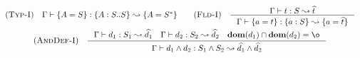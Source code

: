 \[\begin{array}{c}
    \RULE{Typ-I} \quad
        \TJ{\Gamma}{\DEF{A}{S}}{\TDEC{A}{S}{S}}{\DEF{A}{\TRANS{S}}}
    \qquad

    \RULE{Fld-I} \quad \inference{
        \TJ{\Gamma}{t}{S}{\HAT{t}}
    }{
        \TJ{\Gamma}{\DEF{a}{t}}{\FDEC{a}{S}}{\DEF{a}{\HAT{t}}}
    } \\[4mm]

    \RULE{AndDef-I} \quad \inference{
        \TJ{\Gamma}{d_1}{S_1}{\HAT{d_1}} \quad
        \TJ{\Gamma}{d_2}{S_2}{\HAT{d_2}} \quad
        \DOM{d_1} \cap \DOM{d_2} = \o
    }{
        \TJ{\Gamma}{\AGG{d_1}{d_2}}{\AGG{S_1}{S_2}}{\AGG{\HAT{d_1}}{\HAT{d_2}}}
    }
\end{array}\]
